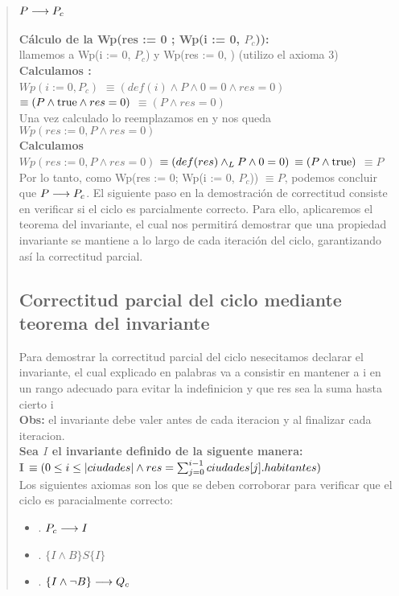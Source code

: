 \documentclass[10pt,a4paper]{article}
\begin{document}
\begin{quote}
 \subsection{\textbf{$P \longrightarrow P_c$}}
 \textbf{Cálculo de la Wp(res := 0 ; Wp(i := 0, $P_c$)):} \\[0.2cm]
 llamemos  a Wp(i := 0, $P_c$) y  Wp(res := 0, ) (utilizo el axioma 3) \\[0.2cm]
 \textbf{Calculamos :} \\[0.2cm]
 $Wp(i := 0, P_c)$ $\equiv(def(i) \land P \land 0 = 0 \land res = 0)$ $\equiv (P \land \mathrm{true} \land res = 0)$ $\equiv (P \land res = 0)$ \\[0.2cm]
 Una vez calculado  lo reemplazamos en  y nos queda $Wp(res := 0, P \land res = 0)$ \\[0.2cm]
 \textbf{Calculamos } \\[0.2cm]
 $Wp(res := 0, P \land res = 0)$ $\equiv (def(res) \land _L P \land 0 = 0)$ $\equiv (P \land \mathrm{true})$ $\equiv P$ \\[0.2cm]
 Por lo tanto, como Wp(res := 0; Wp(i := 0, $P_c$)) $\equiv P$, podemos concluir que $P \longrightarrow P_c$. El siguiente paso en la demostración de correctitud consiste en verificar si el ciclo es parcialmente correcto. Para ello, aplicaremos el teorema del invariante, el cual nos permitirá demostrar que una propiedad invariante se mantiene a lo largo de cada iteración del ciclo, garantizando así la correctitud parcial. 
 \subsection{Correctitud parcial del ciclo mediante teorema del invariante}
 Para demostrar la correctitud parcial del ciclo nesecitamos declarar el invariante, el cual explicado en palabras va a consistir en mantener a i en un rango adecuado para evitar la indefinicion y que res sea la suma hasta cierto i \\ [0.2cm]
 \textbf{Obs:} el invariante debe valer antes de cada iteracion y al finalizar cada iteracion.\\ [0.2cm] 
 \textbf{Sea \(I\) el invariante definido de la siguente manera:} \\ [0.1cm]
 \textbf{I} $\equiv(0 \leq i \leq |ciudades| \land res = \sum_{j=0}^{i-1}ciudades[j].habitantes)$ \\ [0.2cm] 
 Los siguientes axiomas son los que se deben corroborar para verificar que el ciclo es paracialmente correcto:
\begin{itemize}
 \item {}. $P_c \longrightarrow I$
 \item {}. $\{I \land B\} S \{I\}$
 \item {}. $\{I \land \neg B\} \longrightarrow Q_c$
 \end{itemize}
 
\end{quote}
\end{document}
